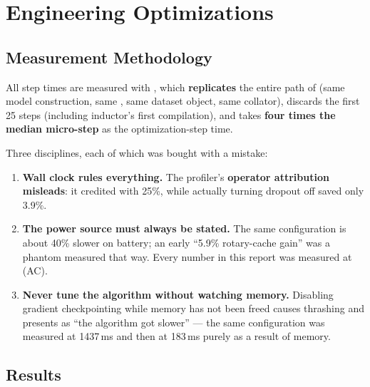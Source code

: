 \documentclass[11pt,openany]{article}
\begin{document}
\section{Engineering Optimizations}
\label{sec:en-eng}

\subsection{Measurement Methodology}
\label{sec:en-eng-method}

All step times are measured with , which \textbf{replicates}
the entire path of  (same model construction, same
, same dataset object, same collator), discards the first 25 steps
(including inductor's first compilation), and takes \textbf{four times the median
micro-step} as the optimization-step time.

Three disciplines, each of which was bought with a mistake:

\begin{enumerate}
\item \textbf{Wall clock rules everything.} The profiler's \textbf{operator attribution
      misleads}: it credited  with 25\%, while actually turning
      dropout off saved only 3.9\%.
\item \textbf{The power source must always be stated.} The same configuration is about
      40\% slower on battery; an early ``5.9\% rotary-cache gain'' was a phantom measured
      that way. Every number in this report was measured at
       (AC).
\item \textbf{Never tune the algorithm without watching memory.} Disabling gradient
      checkpointing while memory has not been freed causes thrashing and presents as ``the
      algorithm got slower'' --- the same configuration was measured at 1437\,ms and then at
      183\,ms purely as a result of memory.
\end{enumerate}

\subsection{Results}
\label{sec:en-eng-results}
\end{document}
